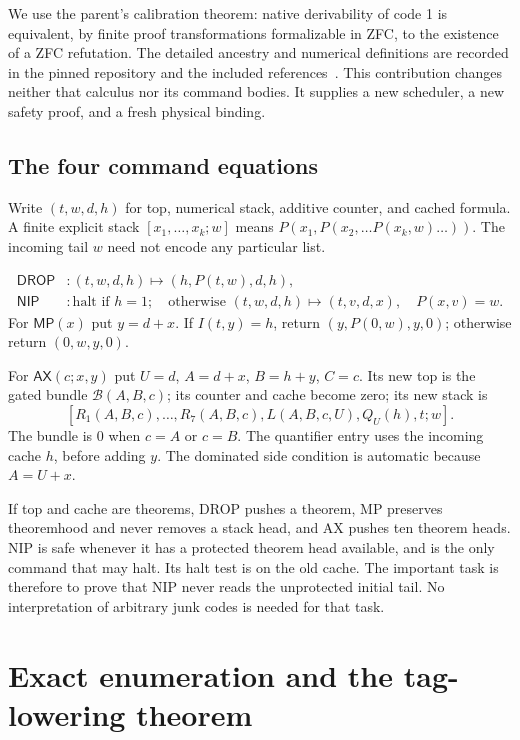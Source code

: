 \documentclass[11pt,a4paper]{article}
\theoremstyle{remark}\newtheorem{remark}[theorem]{Remark}
\newcommand{\D}{\mathsf{DROP}}
\newcommand{\N}{\mathsf{NIP}}
\newcommand{\MP}{\mathsf{MP}}
\newcommand{\AX}{\mathsf{AX}}
\begin{document}
We use the parent's calibration theorem: native derivability of code 1 is equivalent, by finite proof transformations formalizable in ZFC, to the existence of a ZFC refutation. The detailed ancestry and numerical definitions are recorded in the pinned repository and the included references~\cite{parent,dominated,compiler}. This contribution changes neither that calculus nor its command bodies. It supplies a new scheduler, a new safety proof, and a fresh physical binding.

\subsection{The four command equations}

Write $(t,w,d,h)$ for top, numerical stack, additive counter, and cached formula. A finite explicit stack $[x_1,\ldots,x_k;w]$ means $P(x_1,P(x_2,\ldots P(x_k,w)\ldots))$. The incoming tail $w$ need not encode any particular list.

\begin{align*}
 \D &: (t,w,d,h)\longmapsto(h,P(t,w),d,h),\\
 \N &: \text{halt if }h=1;\quad
       \text{otherwise }(t,w,d,h)\longmapsto(t,v,d,x),
       \quad P(x,v)=w.
\end{align*}
For $\MP(x)$ put $y=d+x$. If $I(t,y)=h$, return $(y,P(0,w),y,0)$; otherwise return $(0,w,y,0)$.

For $\AX(c;x,y)$ put $U=d$, $A=d+x$, $B=h+y$, $C=c$. Its new top is the gated bundle $\mathcal B(A,B,c)$; its counter and cache become zero; its new stack is
\[
 [R_1(A,B,c),\ldots,R_7(A,B,c),L(A,B,c,U),Q_U(h),t;w].
\]
The bundle is 0 when $c=A$ or $c=B$. The quantifier entry uses the incoming cache $h$, before adding $y$. The dominated side condition is automatic because $A=U+x$.

If top and cache are theorems, DROP pushes a theorem, MP preserves theoremhood and never removes a stack head, and AX pushes ten theorem heads. NIP is safe whenever it has a protected theorem head available, and is the only command that may halt. Its halt test is on the old cache. The important task is therefore to prove that NIP never reads the unprotected initial tail. No interpretation of arbitrary junk codes is needed for that task.

\section{Exact enumeration and the tag-lowering theorem}\label{sec:credit}
\end{document}
